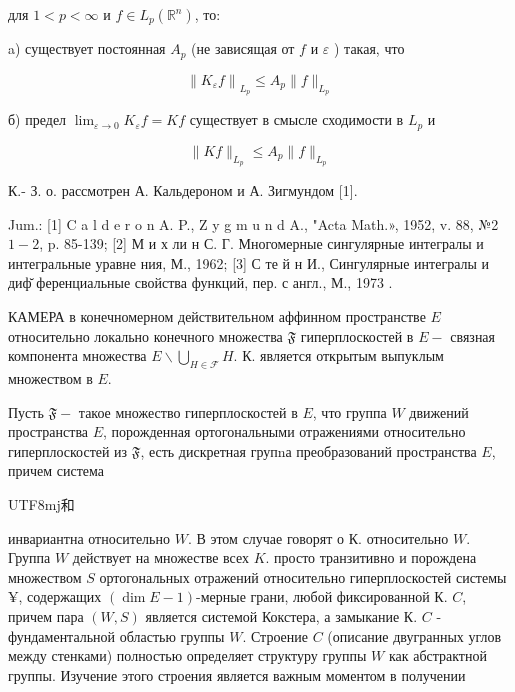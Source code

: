 \documentclass[10pt]{article}
\begin{document}
для $1<p<\infty$ и $f \in L_{p}\left(\mathbb{R}^{n}\right)$, то:



a) существует постоянная $A_{p}$ (не зависящая от $f$ и $\varepsilon$ ) такая, что



\[

\left\|K_{\varepsilon} f\right\|_{L_{p}} \leqslant A_{p}\|f\|_{L_{p}}

\]



б) предел $\lim _{\varepsilon \rightarrow 0} K_{\varepsilon} f=K f$ существует в смысле сходимости в $L_{p}$ и



\[

\|K f\|_{L_{p}} \leqslant A_{p}\|f\|_{L_{p}}

\]



К.- З. о. рассмотрен А. Кальдероном и А. Зигмундом [1].



Jum.: [1] C a l d e r o n A. P., Z y g m u n d A., "Acta Math.», 1952, v. 88, №2 $1-2$, p. 85-139; [2] М и х ли н С. Г. Многомерные сингулярные интегралы и интегральные уравне ния, М., 1962; [3] С те й н И., Сингулярные интегралы и диф̆ ференциальные свойства функций, пер. с англ., М., 1973 .



КАМЕРА в конечномерном действительном аффинном пространстве $E$ относительно локально конечного множества $\mathfrak{F}$ гиперплоскостей в $E-$ связная компонента множества $E \backslash \bigcup_{H \in \mathscr{F}} H$. К. является открытым выпуклым множеством в $E$.



Пусть $\mathfrak{F}-$ такое множество гиперплоскостей в $E$, что группа $W$ движений пространства $E$, порожденная ортогональными отражениями относительно гиперплоскостей из $\mathfrak{F}$, есть дискретная групnа преобразований пространства $E$, причем система \begin{CJK}{UTF8}{mj}和\end{CJK} инвариантна относительно $W$. В этом случае говорят о К. относительно $W$. Группа $W$ действует на множестве всех $K$. просто транзитивно и порождена множеством $S$ ортогональных отражений относительно гиперплоскостей системы $¥$, содержащих $(\operatorname{dim} E-1)$-мерные грани, любой фиксированной К. $C$, причем пара $(W, S)$ является системой Кокстера, а замыкание К. $C$ - фундаментальной областью группы $W$. Строение $C$ (описание двугранных углов между стенками) полностью определяет структуру группы $W$ как абстрактной группы. Изучение этого строения является важным моментом в получении
\end{document}
